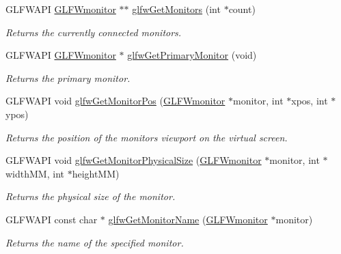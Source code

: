 \begin{DoxyCompactItemize}
\item 
G\+L\+F\+W\+A\+PI \hyperlink{group__monitor_ga8d9efd1cde9426692c73fe40437d0ae3}{G\+L\+F\+Wmonitor} $\ast$$\ast$ \hyperlink{group__monitor_ga8c78e5db186ee10d00c053faf81998af}{glfw\+Get\+Monitors} (int $\ast$count)
\begin{DoxyCompactList}\small\item\em Returns the currently connected monitors. \end{DoxyCompactList}\item 
G\+L\+F\+W\+A\+PI \hyperlink{group__monitor_ga8d9efd1cde9426692c73fe40437d0ae3}{G\+L\+F\+Wmonitor} $\ast$ \hyperlink{group__monitor_ga34befff4f9f0fae09dd8de6fb0eb4f3e}{glfw\+Get\+Primary\+Monitor} (void)
\begin{DoxyCompactList}\small\item\em Returns the primary monitor. \end{DoxyCompactList}\item 
G\+L\+F\+W\+A\+PI void \hyperlink{group__monitor_ga45b5481a614ad7beb2aade9746d07563}{glfw\+Get\+Monitor\+Pos} (\hyperlink{group__monitor_ga8d9efd1cde9426692c73fe40437d0ae3}{G\+L\+F\+Wmonitor} $\ast$monitor, int $\ast$xpos, int $\ast$ypos)
\begin{DoxyCompactList}\small\item\em Returns the position of the monitor\textquotesingle{}s viewport on the virtual screen. \end{DoxyCompactList}\item 
G\+L\+F\+W\+A\+PI void \hyperlink{group__monitor_gad0e93a9e42b32394369cabbbdc1ab702}{glfw\+Get\+Monitor\+Physical\+Size} (\hyperlink{group__monitor_ga8d9efd1cde9426692c73fe40437d0ae3}{G\+L\+F\+Wmonitor} $\ast$monitor, int $\ast$width\+MM, int $\ast$height\+MM)
\begin{DoxyCompactList}\small\item\em Returns the physical size of the monitor. \end{DoxyCompactList}\item 
G\+L\+F\+W\+A\+PI const char $\ast$ \hyperlink{group__monitor_ga6d0ee079c807cd123b56dc3fc01e8fd9}{glfw\+Get\+Monitor\+Name} (\hyperlink{group__monitor_ga8d9efd1cde9426692c73fe40437d0ae3}{G\+L\+F\+Wmonitor} $\ast$monitor)
\begin{DoxyCompactList}\small\item\em Returns the name of the specified monitor. \end{DoxyCompactList}\item 
$$
\end{DoxyCompactItemize}
